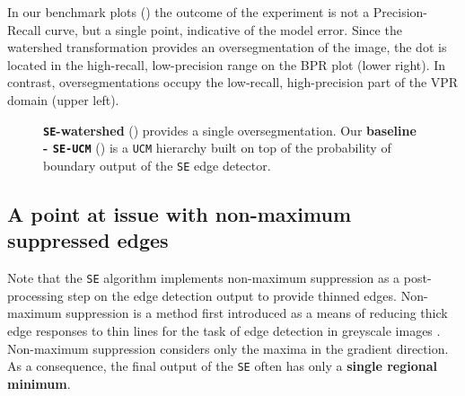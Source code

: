 In our benchmark plots () the outcome of the experiment is not a Precision-Recall curve, but a single point, %
indicative of the model error. Since the watershed transformation provides an oversegmentation of the image, the dot is located in the high-recall, low-precision range on the BPR plot (lower right). In contrast, oversegmentations occupy the low-recall, high-precision part of the VPR domain (upper left). 

\begin{figure}[t]
\centering
\caption[{\tt SE}-watershed and baseline: {\tt SE-UCM} plots]{\textbf{\texttt{SE}-watershed} () provides a single oversegmentation. Our \textbf{ baseline - \texttt{SE-UCM}} () is a {\tt UCM} hierarchy built on top of the probability of boundary output of the {\tt SE} edge detector.}
\label{fig:SE-watershed}
\end{figure}

\subsection{A point at issue %
with non-maximum suppressed edges}
\label{sec:ch5-nms-issue}
Note that the {\tt SE} algorithm implements non-maximum suppression as a post-processing step on the edge detection output to provide thinned edges. Non-maximum suppression is a method first introduced as a means of reducing thick edge responses to thin lines for the task of edge detection in greyscale images \cite{Rosenfeld1976digital}. Non-maximum suppression considers only the maxima in the gradient direction. As a consequence, the final output of the {\tt SE} often has only a {\bf single regional minimum}. 

